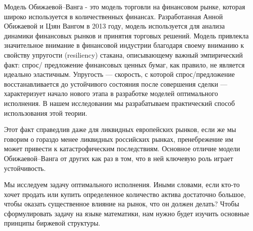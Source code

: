 \introduction %

Модель Обижаевой--Ванга - это модель торговли на финансовом рынке, которая широко используется в количественных финансах.
Разработанная Анной Обижаевой и Цзян Вангом в 2013 году, модель используется для анализа динамики финансовых
рынков и принятия торговых решений. Модель привлекла значительное внимание в финансовой индустрии
благодаря своему вниманию к свойству упругости (resiliency) стакана, описывающему важный эмпирический факт: спрос/
предложение финансовых ценных бумаг, как правило, не является идеально эластичным. Упругость --- скорость, с которой спрос/предложение
восстанавливается до устойчивого состояния после совершения сделки --- характеризует начало нового этапа в разработке
моделей оптимального исполнения. В нашем исследовании мы разрабатываем практический способ использования этой теории.
\par
Этот факт справедлив даже для ликвидных европейских рынков, если же мы говорим о гораздо менее ликвидных российских рынках,
пренебрежение им может привести к катастрофическим последствиям. Основное отличие модели Обижаевой--Ванга  от других как раз
в том, что в ней ключевую роль играет устойчивость.
\par
Мы исследуем задачу оптимального исполнения. Иными словами, если кто-то хочет продать или купить определенное количество актива
достаточно большое, чтобы оказать существенное влияние на рынок, что он должен делать? Чтобы сформулировать задачу на языке
математики, нам нужно будет изучить основные принципы биржевой структуры.


